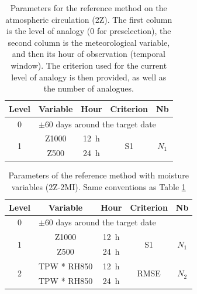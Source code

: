 \documentclass[hess, manuscript]{copernicus}
\begin{document}
	
	\begin{table}[htb]
		\caption{Parameters for the reference method on the atmospheric circulation (2Z). The first column is the level of analogy (0 for preselection), the second column is the meteorological variable, and then its hour of observation (temporal window). The criterion used for the current level of analogy is then provided, as well as the number of analogues.}
		\footnotesize
		\begin{center}
			\begin{tabular}{ccccc}
				\hline
				Level & Variable & Hour & Criterion & Nb \\ 
				\hline 
				0 & \multicolumn{4}{l}{$\pm 60$ days around the target date} \\
				\hline 
				\multirow{2}{*}{1} & Z1000 & 12~h & \multirow{2}{*}{S1} & \multirow{2}{*}{$N_{1}$} \\
				& Z500 & 24~h & & \\ 
				\hline 
			\end{tabular} 
		\end{center}
		\label{table:method_2Z}
	\end{table}
	
	\begin{table}[htb]
		\caption{Parameters of the reference method with moisture variables (2Z-2MI). Same conventions as Table \ref{table:method_2Z}}
		\footnotesize
		\begin{center}
			\begin{tabular}{ccccc}
				\hline 
				Level & Variable & Hour & Criterion & Nb \\ 
				\hline 
				0 & \multicolumn{4}{l}{$\pm 60$ days around the target date} \\
				\hline 
				\multirow{2}{*}{1} & Z1000 & 12~h & \multirow{2}{*}{S1} & \multirow{2}{*}{$N_{1}$} \\
				& Z500 & 24~h & & \\ 
				\hline
				\multirow{2}{*}{2} & TPW * RH850 & 12~h & \multirow{2}{*}{RMSE} & \multirow{2}{*}{$N_{2}$} \\
				& TPW * RH850 & 24~h & & \\ 
				\hline 
			\end{tabular} 
		\end{center}
		\label{table:method_2Z-2MI}
	\end{table}
	
\end{document}
